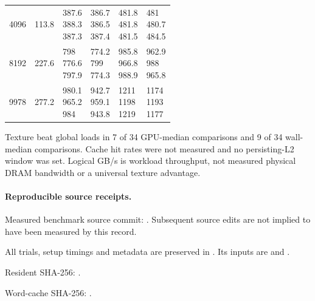 \begin{longtable}{rrp{2.85cm}p{2.85cm}p{2.85cm}p{2.85cm}}
4096 & 113.8 & \shortstack[r]{387.6\\388.3\\387.3} & \shortstack[r]{386.7\\386.5\\387.4} & \shortstack[r]{481.8\\481.8\\481.5} & \shortstack[r]{481\\480.7\\484.5} \\
8192 & 227.6 & \shortstack[r]{798\\776.6\\797.9} & \shortstack[r]{774.2\\799\\774.3} & \shortstack[r]{985.8\\966.8\\988.9} & \shortstack[r]{962.9\\988\\965.8} \\
9978 & 277.2 & \shortstack[r]{980.1\\965.2\\984} & \shortstack[r]{942.7\\959.1\\943.8} & \shortstack[r]{1211\\1198\\1219} & \shortstack[r]{1174\\1193\\1177} \\
\end{longtable}
\endgroup

Texture beat global loads in 7 of 34 GPU-median comparisons and 9 of 34 wall-median comparisons. Cache hit rates were not measured and no persisting-L2 window was set. Logical GB/s is workload throughput, not measured physical DRAM bandwidth or a universal texture advantage.

\paragraph{Reproducible source receipts.}

Measured benchmark source commit: . Subsequent source edits are not implied to have been measured by this record.

All trials, setup timings and metadata are preserved in . Its inputs are  and .

\begin{small}\noindent Resident SHA-256: .\par

\noindent Word-cache SHA-256: .\end{small}
